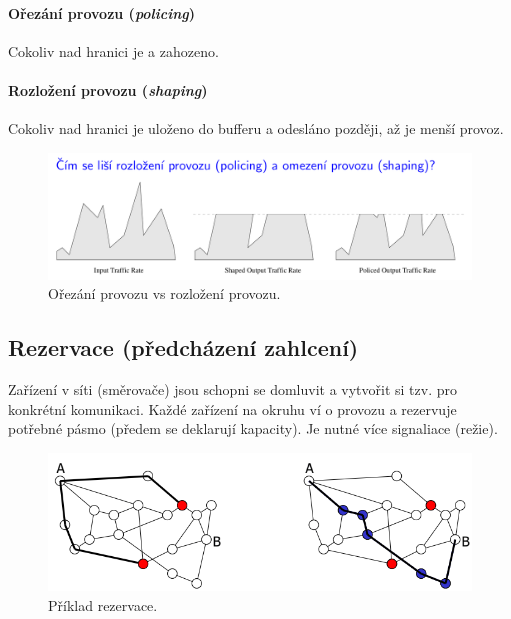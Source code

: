 \paragraph*{Ořezání provozu (\textit{policing})} Cokoliv nad hranici je  a zahozeno.

\paragraph*{Rozložení provozu (\textit{shaping})} Cokoliv nad hranici je uloženo do bufferu a odesláno později, až je menší provoz.

\begin{figure}[H]
    \centering
    \includegraphics[width=1\linewidth]{traffic_policing_and_shaping.png}
    \caption{Ořezání provozu vs rozložení provozu.}
\end{figure}

\subsection{Rezervace (předcházení zahlcení)}

Zařízení v síti (směrovače) jsou schopni se domluvit a vytvořit si tzv.  pro konkrétní komunikaci. Každé zařízení na okruhu ví o provozu a rezervuje potřebné pásmo (předem se deklarují kapacity). Je nutné více signaliace (režie).

\begin{figure}[H]
    \centering
    \includegraphics[width=1\linewidth]{rezervace.png}
    \caption{Příklad rezervace.}
\end{figure}


